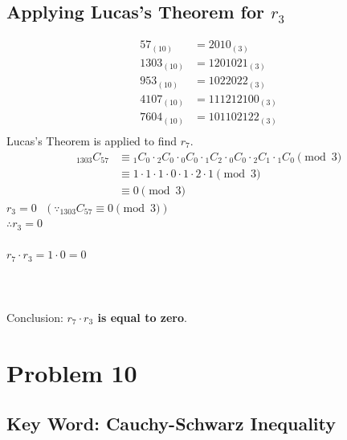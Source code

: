 \documentclass[12pt]{report}
\begin{document}
\section*{Applying Lucas's Theorem for $r_3$}
\begin{align*}
57_{(10)}&=2010_{(3)} \\
1303_{(10)}&=1201021_{(3)} \\
953_{(10)}&=1022022_{(3)} \\
4107_{(10)}&=111212100_{(3)} \\
7604_{(10)}&=101102122_{(3)} \\
\end{align*}
Lucas's Theorem is applied to find $r_7$.
\begin{align*}
    {}_{1303}C_{57}
    &\equiv {}_{1}C_{0}\cdot{}_{2}C_{0}\cdot{}_{0}C_{0}\cdot{}_{1}C_{2}\cdot{}_{0}C_{0}\cdot{}_{2}C_{1}\cdot{}_{1}C_{0} \pmod{3} \\
    &\equiv 1\cdot1\cdot1\cdot0\cdot1\cdot2\cdot1 \pmod{3} \\
    &\equiv 0 \pmod{3}
\end{align*}
$r_3=0 \text{ }(\because {}_{1303}C_{57} \equiv0 \pmod{3})$ \\
$\therefore r_3=0$
\\\\
$r_7 \cdot r_3=1\cdot0=0$
\\\\
\\\\
Conclusion: \textbf{$r_7 \cdot r_3$ is equal to zero}.



\chapter*{Problem 10}
\section*{Key Word: Cauchy-Schwarz Inequality}
\end{document}
